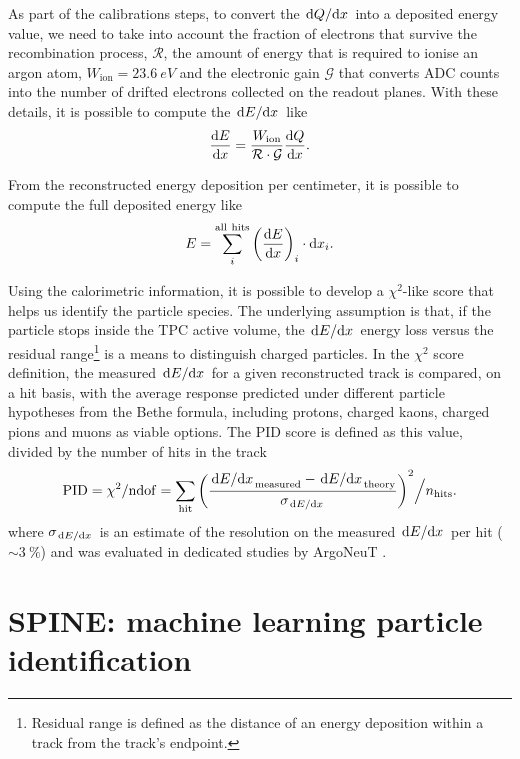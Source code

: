 As part of the calibrations steps, to convert the $\dv*{Q}{x}$ into a deposited energy value, we need to take into account the fraction of electrons that survive the recombination process, $\mathcal{R}$, the amount of energy that is required to ionise an argon atom, $W_\mathrm{ion} = \SI{23.6}{eV}$ \cite{navasReviewParticlePhysics2024} and the electronic gain $\mathcal{G}$ that converts ADC counts into the number of drifted electrons collected on the readout planes. With these details, it is possible to compute the $\dv*{E}{x}$ like \begin{equation}
    \dv{E}{x} = \frac{W_\mathrm{ion}}{\mathcal{R\cdot G}} \dv{Q}{x}. 
\end{equation}

From the reconstructed energy deposition per centimeter, it is possible to compute the full deposited energy like \begin{equation}
    E = \sum_i^\mathrm{all\ hits} \qty(\dv{E}{x} )_i \cdot \dd x_i. 
\end{equation}

Using the calorimetric information, it is possible to develop a $\chi^2$-like score that helps us identify the particle species. The underlying assumption is that, if the particle stops inside the TPC active volume, the $\dv*{E}{x}$ energy loss versus the residual range\footnote{Residual range is defined as the distance of an energy deposition within a track from the track's endpoint.} is a means to distinguish charged particles. In the $\chi^2$ score definition, the measured $\dv*{E}{x}$ for a given reconstructed track is compared, on a hit basis, with the average response predicted under different particle hypotheses from the Bethe formula, including protons, charged kaons, charged pions and muons as viable options. The PID score is defined as this value, divided by the number of hits in the track \cite{arteroponsStudyReconstructionNuMuCC} \begin{equation}
    \mathrm{PID} = \chi^2/\mathrm{ndof} = \sum_\mathrm{hit} \qty(\frac{{\dv*{E}{x}}_\mathrm{measured} - {\dv*{E}{x}}_\mathrm{theory}}{\sigma_{\dv*{E}{x}}})^2 \Big/ n_\mathrm{hits}. \label{eq:PID}
\end{equation} where $\sigma_{\dv*{E}{x}}$ is an estimate of the resolution on the measured $\dv*{E}{x}$ per hit (${\sim}\SI{3}{\percent}$) and was evaluated in dedicated studies by ArgoNeuT \cite{ArgoNeuT:2013kpa}.

\section{SPINE: machine learning particle identification} \label{sec:SPINE}

